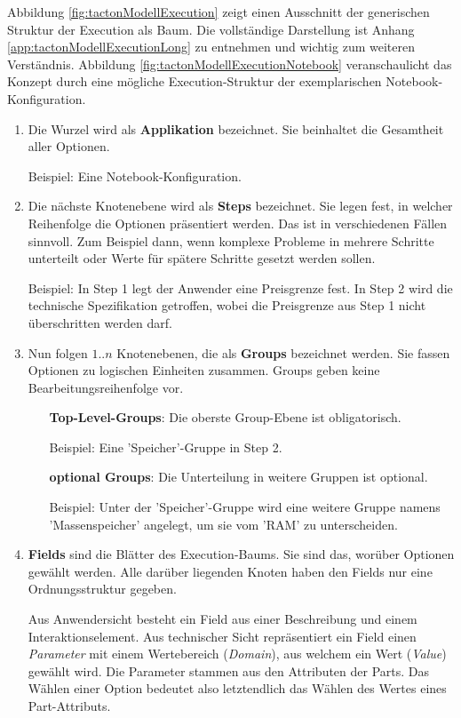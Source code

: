 \documentclass[11pt, a4paper, titlepage, listof=totoc, bibliography=totoc, index=totoc, twoside, openright, headings=normal]{scrreprt}
\begin{document}
Abbildung \ref{fig:tactonModellExecution} zeigt einen Ausschnitt der generischen Struktur der Execution als Baum. Die vollständige Darstellung ist Anhang \ref{app:tactonModellExecutionLong} zu entnehmen und wichtig zum weiteren Verständnis. Abbildung \ref{fig:tactonModellExecutionNotebook} veranschaulicht das Konzept durch eine mögliche Execution-Struktur der exemplarischen Notebook-Konfiguration.

\begin{enumerate}[1.]
\item Die Wurzel wird als \textbf{Applikation} bezeichnet. Sie beinhaltet die Gesamtheit aller Optionen.

Beispiel: Eine Notebook-Konfiguration.
\item Die nächste Knotenebene wird als \textbf{Steps} bezeichnet. Sie legen fest, in welcher Reihenfolge die Optionen präsentiert werden. Das ist in verschiedenen Fällen sinnvoll. Zum Beispiel dann, wenn komplexe Probleme in mehrere Schritte unterteilt oder Werte für spätere Schritte gesetzt werden sollen.

Beispiel: In Step 1 legt der Anwender eine Preisgrenze fest. In Step 2 wird die technische Spezifikation getroffen, wobei die Preisgrenze aus Step 1 nicht überschritten werden darf.
\item  Nun folgen $1..n$ Knotenebenen, die als \textbf{Groups} bezeichnet werden. Sie fassen Optionen zu logischen Einheiten zusammen. Groups geben keine Bearbeitungsreihenfolge vor.
\begin{enumerate}
\item[\textbf{Top-Level-Groups}:] Die oberste Group-Ebene  ist obligatorisch.

Beispiel: Eine 'Speicher'-Gruppe in Step 2.
\item[\textbf{optional Groups}:] Die Unterteilung in weitere Gruppen ist optional.

Beispiel: Unter der 'Speicher'-Gruppe wird eine weitere Gruppe namens 'Massenspeicher' angelegt, um sie vom 'RAM' zu unterscheiden.
\end{enumerate}
\item \textbf{Fields} sind die Blätter des Execution-Baums. Sie sind das, worüber Optionen gewählt werden. Alle darüber liegenden Knoten haben den Fields nur eine Ordnungsstruktur gegeben.

Aus Anwendersicht besteht ein Field aus einer Beschreibung und einem Interaktionselement. Aus technischer Sicht repräsentiert ein Field einen \emph{Parameter} mit einem Wertebereich (\emph{Domain}), aus welchem ein Wert (\emph{Value}) gewählt wird. Die Parameter stammen aus den Attributen der Parts. Das Wählen einer Option bedeutet also letztendlich das Wählen des Wertes eines Part-Attributs.


\end{enumerate}
\end{document}
